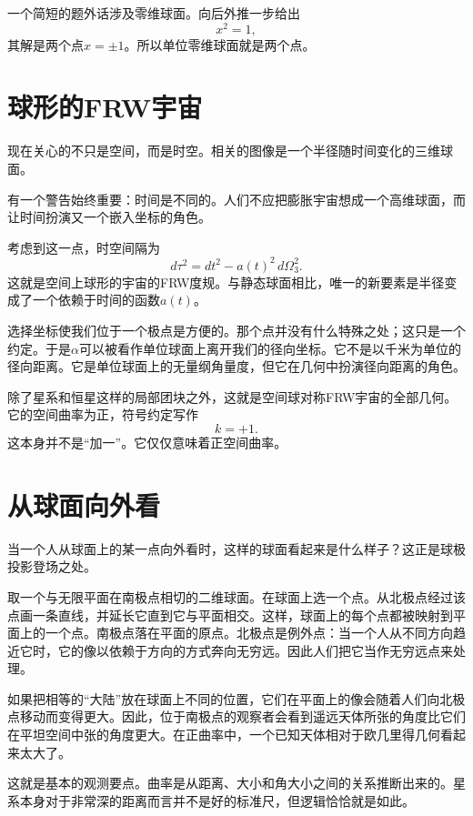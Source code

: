 一个简短的题外话涉及零维球面。向后外推一步给出
\begin{equation}
x^2=1,
\end{equation}
其解是两个点\(x=\pm 1\)。所以单位零维球面就是两个点。

\section{球形的FRW宇宙}

现在关心的不只是空间，而是时空。相关的图像是一个半径随时间变化的三维球面。

有一个警告始终重要：时间是不同的。人们不应把膨胀宇宙想成一个高维球面，而让时间扮演又一个嵌入坐标的角色。

考虑到这一点，时空间隔为
\begin{equation}
d\tau^2=dt^2-a(t)^2\,d\Omega_3^2.
\end{equation}
这就是空间上球形的宇宙的FRW度规。与静态球面相比，唯一的新要素是半径变成了一个依赖于时间的函数\(a(t)\)。

选择坐标使我们位于一个极点是方便的。那个点并没有什么特殊之处；这只是一个约定。于是\(\alpha\)可以被看作单位球面上离开我们的径向坐标。它不是以千米为单位的径向距离。它是单位球面上的无量纲角量度，但它在几何中扮演径向距离的角色。

除了星系和恒星这样的局部团块之外，这就是空间球对称FRW宇宙的全部几何。它的空间曲率为正，符号约定写作
\begin{equation}
k=+1.
\end{equation}
这本身并不是``加一''。它仅仅意味着正空间曲率。

\section{从球面向外看}

当一个人从球面上的某一点向外看时，这样的球面看起来是什么样子？这正是球极投影登场之处。

取一个与无限平面在南极点相切的二维球面。在球面上选一个点。从北极点经过该点画一条直线，并延长它直到它与平面相交。这样，球面上的每个点都被映射到平面上的一个点。南极点落在平面的原点。北极点是例外点：当一个人从不同方向趋近它时，它的像以依赖于方向的方式奔向无穷远。因此人们把它当作无穷远点来处理。

如果把相等的``大陆''放在球面上不同的位置，它们在平面上的像会随着人们向北极点移动而变得更大。因此，位于南极点的观察者会看到遥远天体所张的角度比它们在平坦空间中张的角度更大。在正曲率中，一个已知天体相对于欧几里得几何看起来太大了。

这就是基本的观测要点。曲率是从距离、大小和角大小之间的关系推断出来的。星系本身对于非常深的距离而言并不是好的标准尺，但逻辑恰恰就是如此。

